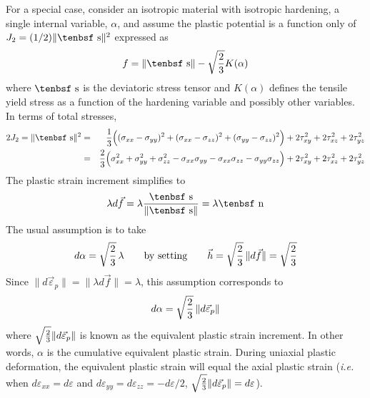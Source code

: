 \documentclass[11pt]{article}
\def\dev{\hbox{\tenbsf s}}
\def\ndev{\hbox{\tenbsf n}}
\def\dpl{d \vec{\varepsilon}_{p}}
\def\df{d \vec{f}}
\def\s#1{\sigma_{#1}}
\begin{document}
For a special case, consider an isotropic material with isotropic hardening, a single internal variable, $\alpha$, and assume the plastic potential is a function only of $J_2= (1/2)\|\dev\|^2$ expressed as
\begin{equation}
      f = \|\dev\| - \sqrt{2\over3} K(\alpha)
\end{equation}
where $\dev$ is the deviatoric stress tensor and $K(\alpha)$ defines the tensile yield stress as a function of the hardening variable and possibly other variables. In terms of total stresses,
\begin{eqnarray}
     2J_2 = \|\dev\|^2 & = & {1\over 3}\Bigl( (\s{xx}-\s{yy})^2 + (\s{xx}-\s{zz})^2  + (\s{yy}-\s{zz})^2 \Bigr) + 2\tau_{xy}^2 + 2\tau_{xz}^2 + 2\tau_{yz}^2 \\
         & = & {2\over3}\Bigl( \s{xx}^2 + \s{yy}^2 + \s{zz}^2 - \s{xx}\s{yy} - \s{xx}\s{zz} - \s{yy}\s{zz}\Bigr) + 2\tau_{xy}^2 + 2\tau_{xz}^2 + 2\tau_{yz}^2
\end{eqnarray}
The plastic strain increment simplifies to
\begin{equation}
     \lambda \df = \lambda {\dev\over \|\dev\|} = \lambda \ndev
\end{equation}
The usual assumption is to take
\begin{equation}
        d\alpha = \sqrt{2\over3}\thinspace \lambda \qquad{\rm by\ setting} \qquad \vec h = \sqrt{2\over3}\thinspace \|\df\| =  \sqrt{2\over3}
\end{equation}
Since $\|\dpl\| = \|\lambda \df\| = \lambda$, this assumption corresponds to
\begin{equation}
     d\alpha = \sqrt{2\over3}\thinspace \|\dpl\|
\end{equation}
where $\sqrt{2\over3}\|\dpl\|$ is known as the equivalent plastic strain increment. In other words, $\alpha$ is the cumulative equivalent plastic strain. During uniaxial plastic deformation, the equivalent plastic strain will equal the axial plastic strain ({\em i.e.} when $d\varepsilon_{xx}=d\varepsilon$ and $d\varepsilon_{yy}=d\varepsilon_{zz} = -d\varepsilon/2$, $\sqrt{2\over3}\|\dpl\| = d\varepsilon$).
\end{document}
